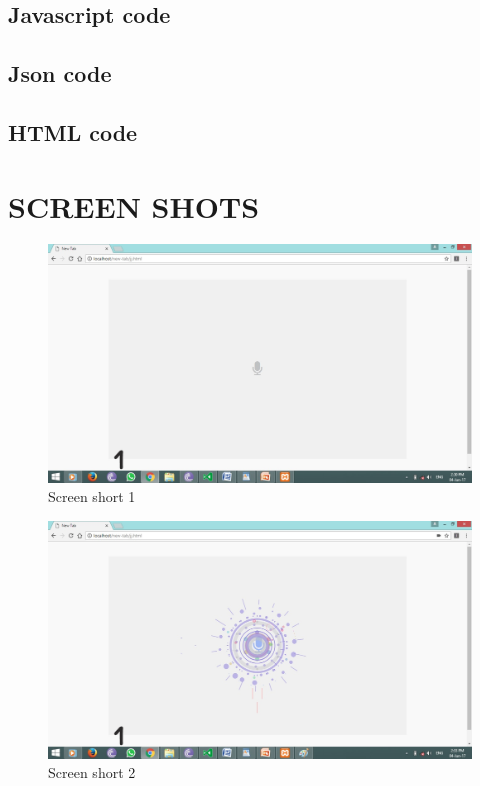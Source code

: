 \documentclass[12pt]{report} %
\begin{document}
\subsection{Javascript code}
\label{subsec:Javascript code}

\subsection{Json code}
\label{subsec:Json code}

\subsection{HTML code}
\label{subsec:HTML code}


\section{SCREEN SHOTS} 
\label{App:SCREEN SHOTS}


\begin{figure}[h]
	\centering
	\includegraphics[width=\linewidth]{figures/screen1.jpg}
	\caption{Screen short 1}
	\label{fig:Screen short 1}
\end{figure}

\begin{figure}[h]
	\centering
	\includegraphics[width=\linewidth]{figures/screen2.jpg}
	\caption{Screen short 2}
	\label{fig:Screen short 2}
\end{figure}
\end{document}
